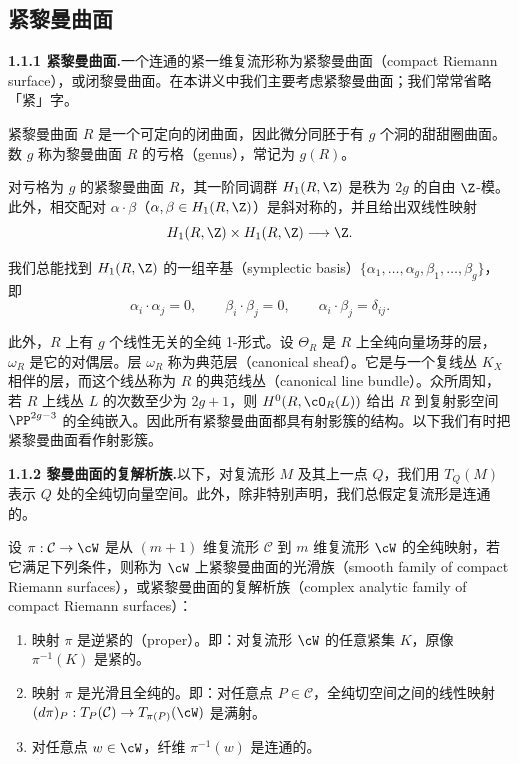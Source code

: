 \subsection{紧黎曼曲面}
\noindent\textbf{1.1.1 紧黎曼曲面.}\quad 一个连通的紧一维复流形称为紧黎曼曲面（compact Riemann surface），或闭黎曼曲面。在本讲义中我们主要考虑紧黎曼曲面；我们常常省略「紧」字。

紧黎曼曲面 $R$ 是一个可定向的闭曲面，因此微分同胚于有 $g$ 个洞的甜甜圈曲面。数 $g$ 称为黎曼曲面 $R$ 的亏格（genus），常记为 $g(R)$。

对亏格为 $g$ 的紧黎曼曲面 $R$，其一阶同调群 $H_1(R,\Z)$ 是秩为 $2g$ 的自由 $\Z$-模。此外，相交配对 $\alpha\cdot\beta$（$\alpha,\beta\in H_1(R,\Z)$）是斜对称的，并且给出双线性映射
\[
  H_1(R,\Z)\times H_1(R,\Z)\longrightarrow \Z .
\]

我们总能找到 $H_1(R,\Z)$ 的一组辛基（symplectic basis）$\{\alpha_1,\dots,\alpha_g,\beta_1,\dots,\beta_g\}$，即
\[
  \alpha_i\cdot\alpha_j=0,\qquad \beta_i\cdot\beta_j=0,\qquad \alpha_i\cdot\beta_j=\delta_{ij}.
\]

此外，$R$ 上有 $g$ 个线性无关的全纯 1-形式。设 $\Theta_R$ 是 $R$ 上全纯向量场芽的层，$\omega_R$ 是它的对偶层。层 $\omega_R$ 称为典范层（canonical sheaf）。它是与一个复线丛 $K_X$ 相伴的层，而这个线丛称为 $R$ 的典范线丛（canonical line bundle）。众所周知，若 $R$ 上线丛 $L$ 的次数至少为 $2g+1$，则 $H^0(R,\cO_R(L))$ 给出 $R$ 到复射影空间 $\PP^{2g-3}$ 的全纯嵌入。因此所有紧黎曼曲面都具有射影簇的结构。以下我们有时把紧黎曼曲面看作射影簇。



\noindent\textbf{1.1.2 黎曼曲面的复解析族.}\quad 以下，对复流形 $M$ 及其上一点 $Q$，我们用 $T_Q(M)$ 表示 $Q$ 处的全纯切向量空间。此外，除非特别声明，我们总假定复流形是连通的。

设 $\pi:\mathcal{C}\to\cW$ 是从 $(m+1)$ 维复流形 $\mathcal{C}$ 到 $m$ 维复流形 $\cW$ 的全纯映射，若它满足下列条件，则称为 $\cW$ 上紧黎曼曲面的光滑族（smooth family of compact Riemann surfaces），或紧黎曼曲面的复解析族（complex analytic family of compact Riemann surfaces）：
\begin{enumerate}[label=(\arabic*)]
\item 映射 $\pi$ 是逆紧的（proper）。即：对复流形 $\cW$ 的任意紧集 $K$，原像 $\pi^{-1}(K)$ 是紧的。
\item 映射 $\pi$ 是光滑且全纯的。即：对任意点 $P\in\mathcal{C}$，全纯切空间之间的线性映射 $(d\pi)_P:T_P(\mathcal{C})\to T_{\pi(P)}(\cW)$ 是满射。
\item 对任意点 $w\in\cW$，纤维 $\pi^{-1}(w)$ 是连通的。
\end{enumerate}

